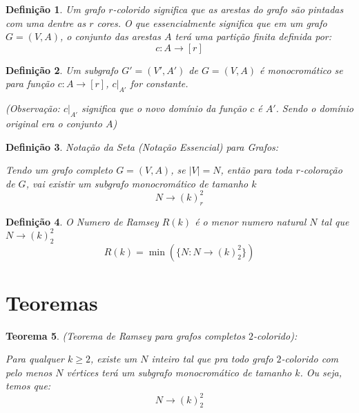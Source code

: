 \documentclass{article}
\newtheorem{teor}{Teorema}[section]
\newtheorem{defi}[teor]{Definição}
\begin{document}
\begin{defi}
    \label{coloring_r}
    Um grafo $r$\emph{-colorido} significa que as arestas do grafo são pintadas com uma dentre as $r$ cores. O que essencialmente significa que em um grafo $G = (V, A)$, o conjunto das arestas $A$ terá uma partição finita definida por:
    \[c:A\rightarrow[r]\]
\end{defi}

\begin{defi}
    \label{monochromatic_k}
    Um subgrafo $G' = (V', A')$ de $G = (V, A)$ é \emph{monocromático} se para função $c:A\rightarrow[r]$, $c|_{A'}$ for constante.

    (Observação: $c|_{A'}$ significa que o novo domínio da função $c$ é $A'$. Sendo o domínio original era o conjunto $A$)
\end{defi}

\begin{defi}
    \label{essential_notation_graph}
    \emph{Notação da Seta (Notação Essencial) para Grafos}:

    Tendo um grafo completo $G = (V, A)$, se $|V| = N$, então para toda $r$\emph{-coloração} de $G$, vai existir um subgrafo monocromático de tamanho $k$
    \[N\longrightarrow(k)_r^2\]
\end{defi}

\begin{defi}
    \label{ramsey_number}
    O \emph{Numero de Ramsey} $R(k)$ é o menor numero natural $N$ tal que $N\longrightarrow(k)_2^2$
    \[R(k) = \min(\{N: N\longrightarrow(k)_2^2\})\]
\end{defi}


\section{Teoremas}


\begin{teor}
    (\emph{Teorema de Ramsey} para grafos completos $2$\emph{-colorido}):

    Para qualquer $k \ge 2$, existe um $N$ inteiro tal que pra todo grafo $2$\emph{-colorido} com pelo menos $N$ vértices terá um subgrafo monocromático de tamanho $k$. Ou seja, temos que:
    \[N\longrightarrow(k)_2^2\]
\end{teor}
\end{document}
